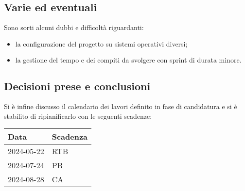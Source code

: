 \documentclass[italian,12pt]{article}
\begin{document}
\subsection{Varie ed eventuali}
Sono sorti alcuni dubbi e difficoltà riguardanti:
\begin{itemize}
	\item la configurazione del progetto su sistemi operativi diversi;
	\item la gestione del tempo e dei compiti da svolgere con sprint di durata minore.
\end{itemize}

\subsection{Decisioni prese e conclusioni}
Si è infine discusso il calendario dei lavori definito in fase di candidatura e si è stabilito di ripianificarlo con le seguenti scadenze:
\begin{table}[!h]
	\begin{center}
		\begin{tabular}{ | l | l | }
			\hline
			\textbf{Data} & \textbf{Scadenza} \\
			\hline
			2024-05-22    & RTB               \\
			2024-07-24    & PB                \\
			2024-08-28    & CA                \\
			\hline
		\end{tabular}
	\end{center}
\end{table}
\end{document}

